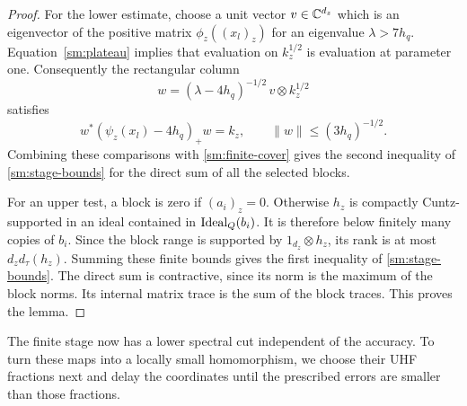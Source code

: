 \begin{proof}
For the lower estimate, choose a unit vector \(v\in\mathbb C^{d_z}\)
which is an eigenvector of the positive matrix
\(\phi_z((x_l)_z)\) for an eigenvalue \(\lambda>7h_q\).
Equation~\eqref{sm:plateau} implies that evaluation on
\(k_z^{1/2}\) is evaluation at parameter one.  Consequently
the rectangular column
\[
 w=(\lambda-4h_q)^{-1/2}\,v\otimes k_z^{1/2}
\]
satisfies
\begin{equation}\label{sm:plateau-witness}
 w^*(\psi_z(x_l)-4h_q)_+w=k_z,
 \qquad \|w\|\leq(3h_q)^{-1/2}.
\end{equation}
Combining these comparisons with
\eqref{sm:finite-cover} gives the second inequality of
\eqref{sm:stage-bounds} for the direct sum of all the
selected blocks.

For an upper test, a block is zero if \((a_i)_z=0\).
Otherwise \(h_z\) is compactly Cuntz-supported in an ideal
contained in \(\operatorname{Ideal}_Q(b_i)\).  It is therefore below
finitely many copies of \(b_i\).  Since the block range
is supported by \(1_{d_z}\otimes h_z\), its rank is at
most \(d_zd_\tau(h_z)\).  Summing these finite bounds gives
the first inequality of \eqref{sm:stage-bounds}.
The direct sum is contractive, since its norm is the maximum
of the block norms.  Its internal matrix trace is the sum
of the block traces.  This proves the lemma.
\end{proof}

The finite stage now has a lower spectral cut independent of the
accuracy.  To turn these maps into a locally small homomorphism, we
choose their UHF fractions next and delay the coordinates until the
prescribed errors are smaller than those fractions.

